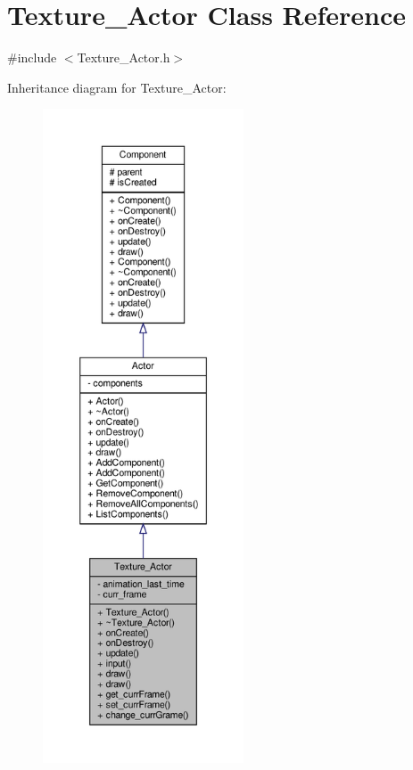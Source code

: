 \hypertarget{classTexture__Actor}{}\section{Texture\+\_\+\+Actor Class Reference}
\label{classTexture__Actor}


{\ttfamily \#include $<$Texture\+\_\+\+Actor.\+h$>$}



Inheritance diagram for Texture\+\_\+\+Actor\+:
\nopagebreak
\begin{figure}[H]
\begin{center}
\leavevmode
\includegraphics[height=550pt]{classTexture__Actor__inherit__graph}
\end{center}
\end{figure}


